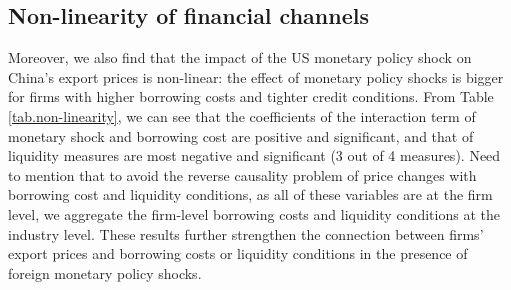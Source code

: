 \subsection{Non-linearity of financial channels}

Moreover, we also find that the impact of the US monetary policy shock on China's export prices is non-linear: the effect of monetary policy shocks is bigger for firms with higher borrowing costs and tighter credit conditions. From Table \ref{tab.non-linearity}, we can see that the coefficients of the interaction term of monetary shock and borrowing cost are positive and significant, and that of liquidity measures are most negative and significant (3 out of 4 measures). Need to mention that to avoid the reverse causality problem of price changes with borrowing cost and liquidity conditions, as all of these variables are at the firm level, we aggregate the firm-level borrowing costs and liquidity conditions at the industry level. These results further strengthen the connection between firms' export prices and borrowing costs or liquidity conditions in the presence of foreign monetary policy shocks.

